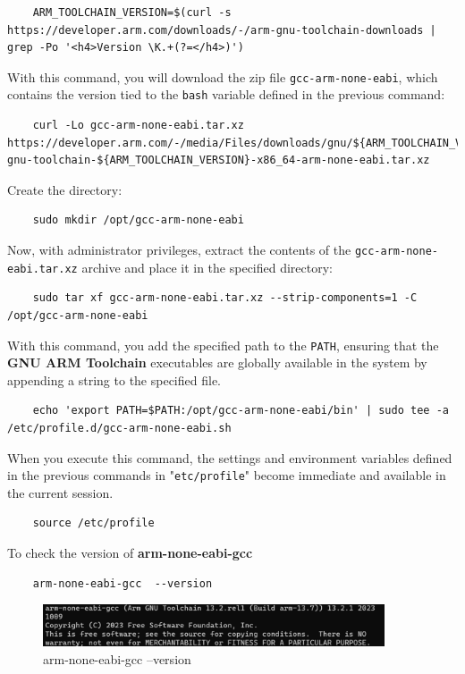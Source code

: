 \documentclass{exam}
\begin{document}
\begin{lstlisting}
    ARM_TOOLCHAIN_VERSION=$(curl -s https://developer.arm.com/downloads/-/arm-gnu-toolchain-downloads | grep -Po '<h4>Version \K.+(?=</h4>)')    
\end{lstlisting}
With this command, you will download the zip file \texttt{gcc-arm-none-eabi}, which contains the version tied to the \texttt{bash} variable defined in the previous command:
\begin{lstlisting}
    curl -Lo gcc-arm-none-eabi.tar.xz https://developer.arm.com/-/media/Files/downloads/gnu/${ARM_TOOLCHAIN_VERSION}/binrel/arm-gnu-toolchain-${ARM_TOOLCHAIN_VERSION}-x86_64-arm-none-eabi.tar.xz
\end{lstlisting}
Create the directory:
\begin{lstlisting}
    sudo mkdir /opt/gcc-arm-none-eabi
\end{lstlisting}
Now, with administrator privileges, extract the contents of the \texttt{gcc-arm-none-eabi.tar.xz} archive and place it in the specified directory:
\begin{lstlisting}
    sudo tar xf gcc-arm-none-eabi.tar.xz --strip-components=1 -C /opt/gcc-arm-none-eabi
\end{lstlisting}
With this command, you add the specified path to the \texttt{PATH}, ensuring that the \textbf{GNU ARM Toolchain} executables are globally available in the system by appending a string to the specified file.
\begin{lstlisting}
    echo 'export PATH=$PATH:/opt/gcc-arm-none-eabi/bin' | sudo tee -a /etc/profile.d/gcc-arm-none-eabi.sh
\end{lstlisting}
When you execute this command, the settings and environment variables defined in the previous commands in "\texttt{etc/profile}" become immediate and available in the current session.
\begin{lstlisting}
    source /etc/profile
\end{lstlisting}
To check the version of \textbf{arm-none-eabi-gcc}
\begin{lstlisting}
    arm-none-eabi-gcc  --version 
\end{lstlisting}
\begin{figure}[h]
    \centering
    \includegraphics[width=0.90\textwidth]{graphics/arm-none-eabi-gcc-version.png}
    \caption{arm-none-eabi-gcc  --version}
    \label{fig:riferimentoNelTestoNelCasoVogliaCitareLimmagine}
\end{figure}
\end{document}
